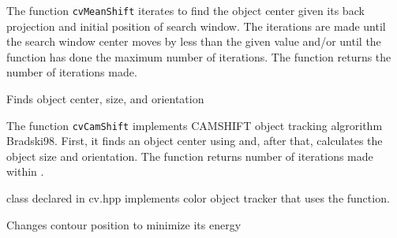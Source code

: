 The function \texttt{cvMeanShift} iterates to find the object center
given its back projection and initial position of search window. The
iterations are made until the search window center moves by less than
the given value and/or until the function has done the maximum number
of iterations. The function returns the number of iterations made.

\label{CamShift}

Finds object center, size, and orientation


\begin{description}
\end{description}

The function \texttt{cvCamShift} implements CAMSHIFT object tracking algrorithm
Bradski98.
First, it finds an object center using  and, after that, calculates the object size and orientation. The function returns number of iterations made within .

 class declared in cv.hpp implements color object tracker that uses the function.

\label{SnakeImage}

Changes contour position to minimize its energy


